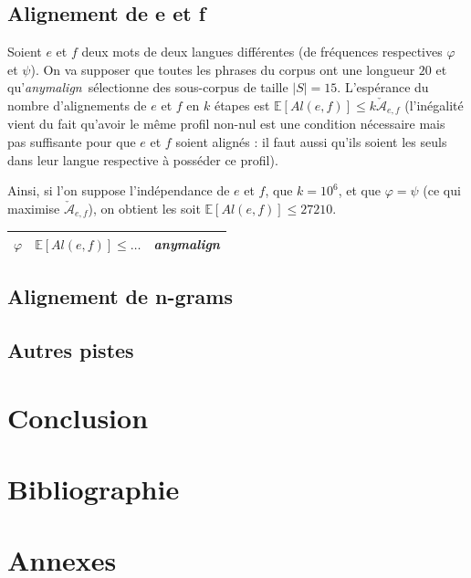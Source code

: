\documentclass[a4paper,10pt]{article}
\newcommand{\anym}{\emph{anymalign}}
\begin{document}


\subsection{Alignement de e et f}

Soient $e$ et $f$ deux mots de deux langues différentes (de fréquences respectives $\varphi$ et $\psi$). On va supposer que toutes les phrases du corpus ont une longueur $20$ et qu'\anym~sélectionne des sous-corpus de taille $|S|=15$. L'espérance du nombre d'alignements de $e$ et $f$ en $k$ étapes est $\mathbb{E}[Al(e,f)] \leq k\check{\mathcal{A}}_{e,f}$ (l'inégalité vient du fait qu'avoir le même profil non-nul est une condition nécessaire mais pas suffisante pour que $e$ et $f$ soient alignés : il faut aussi qu'ils soient les seuls dans leur langue respective à posséder ce profil).

Ainsi, si l'on suppose l'indépendance de $e$ et $f$, que $k=10^6$, et que $\varphi = \psi$ (ce qui maximise %
$\check{\mathcal{A}}_{e,f}$), on obtient les  soit $\mathbb{E}[Al(e,f)] \leq 27210$.

\begin{tabular}{|l|l|l|}
\hline
$\varphi$ & $\mathbb{E}[Al(e,f)] \leq \dots$ & \anym \\
\hline
\end{tabular}


\subsection{Alignement de n-grams}

\subsection{Autres pistes}


\section{Conclusion}


\section{Bibliographie}




\section{Annexes}

\end{document}
